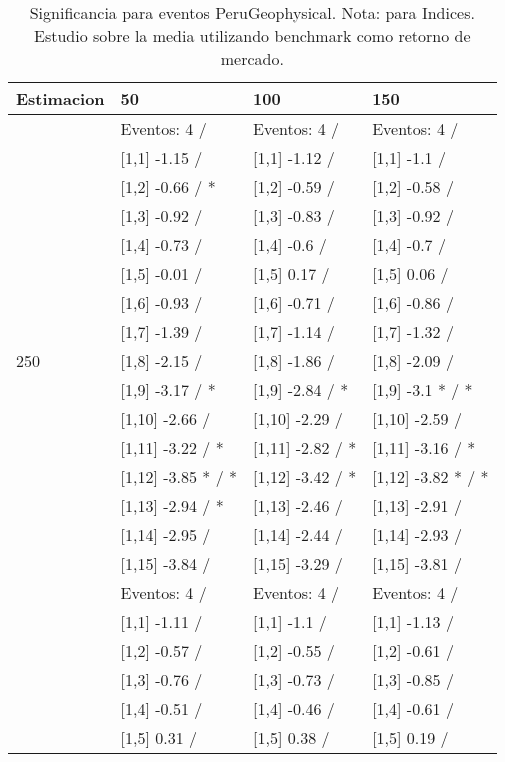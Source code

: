 \begin{table}

\caption{Significancia para eventos PeruGeophysical. Nota: para Indices. Estudio sobre la media utilizando benchmark como retorno de mercado.}
\centering
\begin{tabular}[t]{llll}
\toprule
Estimacion & 50 & 100 & 150\\
\midrule
 & Eventos:  4 / & Eventos:  4 / & Eventos:  4 /\\
 & {}[1,1] -1.15  / & {}[1,1] -1.12  / & {}[1,1] -1.1  /\\
 & {}[1,2] -0.66  / * & {}[1,2] -0.59  / & {}[1,2] -0.58  /\\
 & {}[1,3] -0.92  / & {}[1,3] -0.83  / & {}[1,3] -0.92  /\\
 & {}[1,4] -0.73  / & {}[1,4] -0.6  / & {}[1,4] -0.7  /\\
\addlinespace
 & {}[1,5] -0.01  / & {}[1,5] 0.17  / & {}[1,5] 0.06  /\\
 & {}[1,6] -0.93  / & {}[1,6] -0.71  / & {}[1,6] -0.86  /\\
 & {}[1,7] -1.39  / & {}[1,7] -1.14  / & {}[1,7] -1.32  /\\
250 & {}[1,8] -2.15  / & {}[1,8] -1.86  / & {}[1,8] -2.09  /\\
 & {}[1,9] -3.17  / * & {}[1,9] -2.84  / * & {}[1,9] -3.1 * / *\\
\addlinespace
 & {}[1,10] -2.66  / & {}[1,10] -2.29  / & {}[1,10] -2.59  /\\
 & {}[1,11] -3.22  / * & {}[1,11] -2.82  / * & {}[1,11] -3.16  / *\\
 & {}[1,12] -3.85 * / * & {}[1,12] -3.42  / * & {}[1,12] -3.82 * / *\\
 & {}[1,13] -2.94  / * & {}[1,13] -2.46  / & {}[1,13] -2.91  /\\
 & {}[1,14] -2.95  / & {}[1,14] -2.44  / & {}[1,14] -2.93  /\\
\addlinespace
 & {}[1,15] -3.84  / & {}[1,15] -3.29  / & {}[1,15] -3.81  /\\
 & Eventos:  4 / & Eventos:  4 / & Eventos:  4 /\\
 & {}[1,1] -1.11  / & {}[1,1] -1.1  / & {}[1,1] -1.13  /\\
 & {}[1,2] -0.57  / & {}[1,2] -0.55  / & {}[1,2] -0.61  /\\
 & {}[1,3] -0.76  / & {}[1,3] -0.73  / & {}[1,3] -0.85  /\\
\addlinespace
 & {}[1,4] -0.51  / & {}[1,4] -0.46  / & {}[1,4] -0.61  /\\
 & {}[1,5] 0.31  / & {}[1,5] 0.38  / & {}[1,5] 0.19  /\\

\end{tabular}
\end{table}
